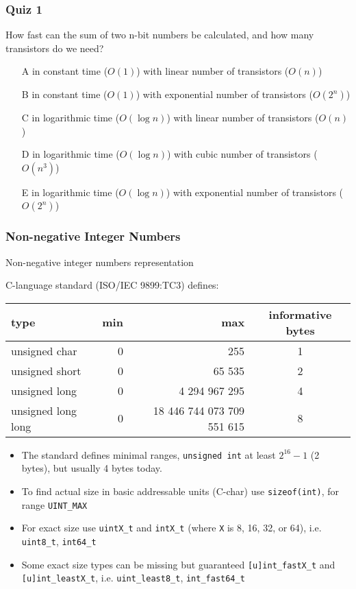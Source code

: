 \documentclass{beamer}
\begin{document}
\begin{frame}
\frametitle{Quiz 1}
How fast can the sum of two n-bit numbers be calculated, and how many transistors do we need?
\begin{itemize}
\item[A] in constant time ($O(1)$) with linear number of transistors ($O(n)$)
\item[B] in constant time ($O(1)$) with exponential number of transistors ($O(2^n)$)
\item[C] in logarithmic time ($O(\log{n})$) with linear number of transistors ($O(n)$)
\item[D] in logarithmic time ($O(\log{n})$) with cubic number of transistors ($O(n^3)$)
\item[E] in logarithmic time ($O(\log{n})$) with exponential number of transistors ($O(2^n)$)
\end{itemize}
\end{frame}


\begin{frame}
\frametitle{Non-negative Integer Numbers}
Non-negative integer numbers representation

C-language standard (ISO/IEC 9899:TC3) defines:
\begin{tabular}{|l|r|r|c|}\hline
type & min & max & informative bytes\\ \hline
unsigned char & 0 & 255 & 1 \\ \hline
unsigned short & 0 & 65 535 & 2 \\ \hline 
unsigned long & 0 & 4 294 967 295 & 4 \\ \hline
unsigned long long & 0 & 18 446 744 073 709 551 615 & 8 \\ \hline
\end{tabular}

\begin{itemize}
\item The standard defines minimal ranges, \texttt{unsigned int} at least $2^{16}-1$ (2 bytes), but usually 4 bytes today.
\item To find actual size in basic addressable units (C-char) use \texttt{sizeof(int)}, for range \texttt{UINT\_MAX}
\item For exact size use \texttt{uintX\_t} and \texttt{intX\_t} (where \texttt{X} is 8, 16, 32, or 64), i.e. \texttt{uint8\_t}, \texttt{int64\_t}
\item Some exact size types can be missing but guaranteed \texttt{[u]int\_fastX\_t} and \texttt{[u]int\_leastX\_t}, i.e. \texttt{uint\_least8\_t}, \texttt{int\_fast64\_t}
\end{itemize}

\end{frame}
\end{document}
